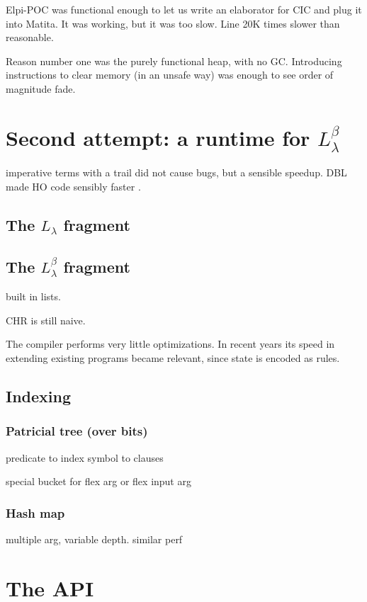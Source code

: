 \documentclass[a4paper, 11pt]{book}
\begin{document}
Elpi-POC was functional enough to let us write an elaborator for CIC
and plug it into Matita. It was working, but it was too slow. Line 20K times
slower than reasonable.

Reason number one was the purely functional heap, with no GC. Introducing 
instructions to clear memory (in an unsafe way) was enough to see order of
magnitude fade.

\section{Second attempt: a runtime for $L_{\lambda}^{\beta}$}

imperative terms with a trail did not cause bugs, but a sensible speedup.
DBL made HO code sensibly faster \cite{dunchev15lpar}.

\subsection{The $L_{\lambda}$ fragment}
\subsection{The $L_{\lambda}^{\beta}$ fragment}

\cite{Michaylov1993HigherOrderLP}

built in lists.

CHR is still naive.

The compiler performs very little optimizations. In recent years its speed
in extending existing programs became relevant, since state is encoded as rules.

\subsection{Indexing}
\subsubsection{Patricial tree (over bits)}

predicate to index
symbol to clauses

special bucket for flex arg or flex input arg

\subsubsection{Hash map}

multiple arg, variable depth. similar perf


\section{The API}
\end{document}
